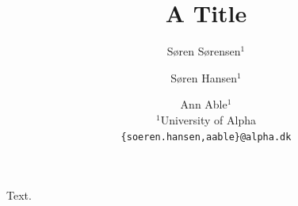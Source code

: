 \documentclass{article}
\title{A Title}
\author{%
  S{\o}ren S{\o}rensen$^{1}$ \and
  S{\o}ren Hansen$^{1}$ \and
  Ann Able$^{1}$ \\
 {\normalfont $^1$University of Alpha} \\
 \texttt{\{soeren.hansen,aable\}@alpha.dk}
}
\begin{document}
\maketitle
Text.
\end{document}
